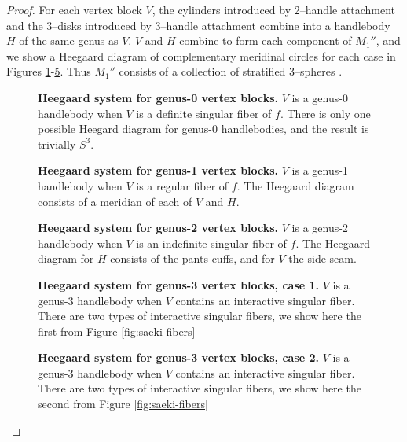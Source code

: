 \begin{proof}
	For each vertex block $V$, the cylinders introduced by 2--handle attachment and the 3--disks introduced by 3--handle attachment combine into a handlebody $H$ of the same genus as $V$.
	$V$ and $H$ combine to form each component of $M_1''$, and we show a Heegaard diagram of complementary meridinal circles for each case in Figures \ref{fig:heegaard-genus-0}-\ref{fig:heegaard-genus-3-2}.
	Thus $M_1''$ consists of a collection of stratified 3--spheres \cite{SchlWald}.
	
	\begin{figure}[h!]
		\caption{
			\textbf{Heegaard system for genus-0 vertex blocks.}
			$V$ is a genus-0 handlebody when $V$ is a definite singular fiber of $f$.
			There is only one possible Heegard diagram for genus-0 handlebodies, and the result is trivially $S^3$.
		}
		\label{fig:heegaard-genus-0}
	\end{figure}

	\begin{figure}[h!]
		\caption{
			\textbf{Heegaard system for genus-1 vertex blocks.}
			$V$ is a genus-1 handlebody when $V$ is a regular fiber of $f$.
			The Heegaard diagram consists of a meridian of each of $V$ and $H$.
		}
		\label{fig:heegaard-genus-1}
	\end{figure}

	\begin{figure}[h!]
		\caption{
			\textbf{Heegaard system for genus-2 vertex blocks.}
			$V$ is a genus-2 handlebody when $V$ is an indefinite singular fiber of $f$.
			The Heegaard diagram for $H$ consists of the pants cuffs, and for $V$ the side seam.
		}
		\label{fig:heegaard-genus-2}
	\end{figure}

	
	\begin{figure}[h!]
		\caption{
			\textbf{Heegaard system for genus-3 vertex blocks, case 1.}
			$V$ is a genus-3 handlebody when $V$ contains an interactive singular fiber.
			There are two types of interactive singular fibers, we show here the first from Figure \ref{fig:saeki-fibers}
		}
		\label{fig:heegaard-genus-3-1}
	\end{figure}
	
	
	\begin{figure}[h!]
		\caption{
			\textbf{Heegaard system for genus-3 vertex blocks, case 2.}
			$V$ is a genus-3 handlebody when $V$ contains an interactive singular fiber.
			There are two types of interactive singular fibers, we show here the second from Figure \ref{fig:saeki-fibers}
		}
		\label{fig:heegaard-genus-3-2}
	\end{figure}	
\end{proof}


